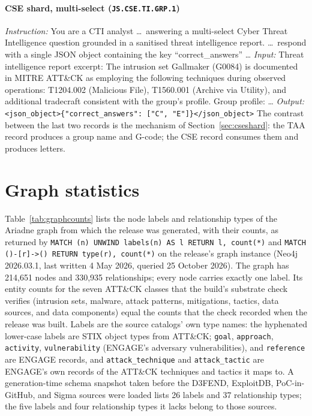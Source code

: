 \documentclass[twocolumn]{svjour3}
\begin{document}
\begin{appendix}
\paragraph{CSE shard, multi-select (\texttt{JS.CSE.TI.GRP.1})}
\emph{Instruction:} You are a CTI analyst \ldots\ answering a multi-select Cyber Threat Intelligence question grounded in a sanitised threat intelligence report. \ldots\ respond with a single JSON object containing the key ``correct\_answers'' \ldots
\emph{Input:} Threat intelligence report excerpt: The intrusion set Gallmaker (G0084) is documented in MITRE ATT\&CK as employing the following techniques during observed operations: T1204.002 (Malicious File), T1560.001 (Archive via Utility), and additional tradecraft consistent with the group's profile. Group profile: \ldots
\emph{Output:} \texttt{<json\_object>\{"correct\_answers": ["C", "E"]\}</json\_object>}
The contrast between the last two records is the mechanism of Section~\ref{sec:cseshard}: the TAA record produces a group name and G-code; the CSE record consumes them and produces letters.

\section{Graph statistics}\label{app:graph}
Table~\ref{tab:graphcounts} lists the node labels and relationship types of the Ariadne graph from which the release was generated, with their counts, as returned by \texttt{MATCH (n) UNWIND labels(n) AS l RETURN l, count(*)} and \texttt{MATCH ()-[r]->() RETURN type(r), count(*)} on the release's graph instance (Neo4j 2026.03.1, last written 4 May 2026, queried 25 October 2026). The graph has 214,651 nodes and 330,935 relationships; every node carries exactly one label. Its entity counts for the seven ATT\&CK classes that the build's substrate check verifies (intrusion sets, malware, attack patterns, mitigations, tactics, data sources, and data components) equal the counts that the check recorded when the release was built. Labels are the source catalogs' own type names: the hyphenated lower-case labels are STIX object types from ATT\&CK; \texttt{goal}, \texttt{approach}, \texttt{activity}, \texttt{vulnerability} (ENGAGE's adversary vulnerabilities), and \texttt{reference} are ENGAGE records, and \texttt{attack\_technique} and \texttt{attack\_tactic} are ENGAGE's own records of the ATT\&CK techniques and tactics it maps to. A generation-time schema snapshot taken before the D3FEND, ExploitDB, PoC-in-GitHub, and Sigma sources were loaded lists 26 labels and 37 relationship types; the five labels and four relationship types it lacks belong to those sources.


\end{appendix}
\end{document}
